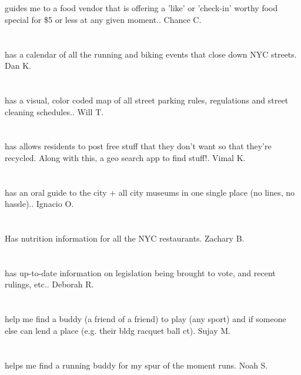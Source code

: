 \section{}guides me to a food vendor that is offering a 'like' or 'check-in' worthy food special for \$5 or less at any given moment.. Chance C.
\section{}has a calendar of all the running and biking events that close down NYC streets. Dan K.
\section{}has a visual,  color coded map of all street parking rules,  regulations and street cleaning schedules.. Will T.
\section{}has allows residents to post free stuff that they don't want so that they're recycled.  Along with this,  a geo search app to find stuff!. Vimal K.
\section{}has an oral guide to the city + all city museums in one single place (no lines,  no hassle).. Ignacio O.
\section{}Has nutrition information for all the NYC restaurants. Zachary B.
\section{}has up-to-date information on legislation being brought to vote,  and recent rulings,  etc.. Deborah R.
\section{}help me find a buddy (a friend of a friend) to play (any sport) and if someone else can lend a place (e.g. their bldg racquet ball ct). Sujay M.
\section{}helps me find a running buddy for my spur of the moment runs. Noah S.
